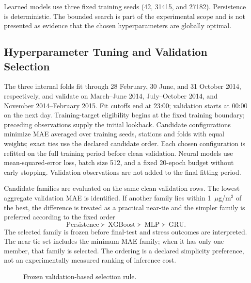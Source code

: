 \documentclass[journal]{IEEEtran}
\begin{document}
Learned models use three fixed training seeds (42, 31415, and 27182). Persistence is deterministic. The bounded search is part of the experimental scope and is not presented as evidence that the chosen hyperparameters are globally optimal.

\subsection{Hyperparameter Tuning and Validation Selection}
The three internal folds fit through 28 February, 30 June, and 31 October 2014, respectively, and validate on March--June 2014, July--October 2014, and November 2014--February 2015. Fit cutoffs end at 23:00; validation starts at 00:00 on the next day. Training-target eligibility begins at the fixed training boundary; preceding observations supply the initial lookback. Candidate configurations minimize MAE averaged over training seeds, stations and folds with equal weights; exact ties use the declared candidate order. Each chosen configuration is refitted on the full training period before clean validation. Neural models use mean-squared-error loss, batch size 512, and a fixed 20-epoch budget without early stopping. Validation observations are not added to the final fitting period.

Candidate families are evaluated on the same clean validation rows. The lowest aggregate validation MAE is identified. If another family lies within 1~$\mu$g/m$^3$ of the best, the difference is treated as a practical near-tie and the simpler family is preferred according to the fixed order
\[
\text{Persistence} \succ \text{XGBoost} \succ \text{MLP} \succ \text{GRU}.
\]
The selected family is frozen before final-test and stress outcomes are interpreted. The near-tie set includes the minimum-MAE family; when it has only one member, that family is selected. The ordering is a declared simplicity preference, not an experimentally measured ranking of inference cost.

\begin{figure}[!t]
\centering
{}
\caption{Frozen validation-based selection rule.}
\label{fig:rule}
\end{figure}
\end{document}
